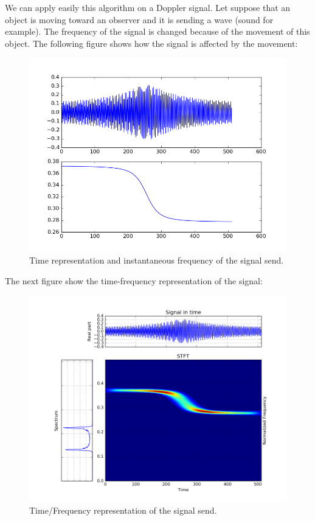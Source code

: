 We can apply easily this algorithm on a Doppler signal. Let suppose that an object is moving toward an observer and it is sending a wave (sound for example). The frequency of the signal is changed because of the movement of this object. The following figure shows how the signal is affected by the movement:

\begin{figure}[H]
\centering
    \includegraphics[scale=0.7,angle=0]{Images/doopler_signal.png}
    \caption{Time representation and instantaneous frequency of the signal send.}
    \label{fig:doopler_signal}
\end{figure}

The next figure show the time-frequency representation of the signal:

\begin{figure}[H]
\centering
    \includegraphics[scale=0.6,angle=0]{Images/doopler_signal_spec.png}
    \caption{Time/Frequency representation of the signal send.}
    \label{fig:doopler_signal_spec}
\end{figure}

